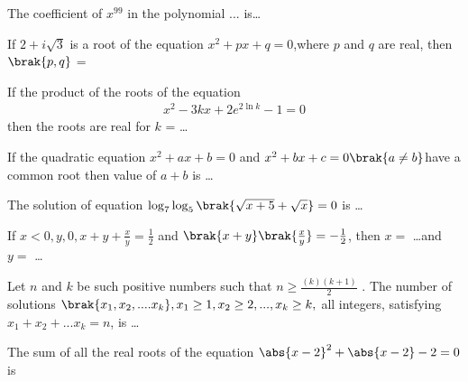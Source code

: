 \iffalse
\title{CHAPTER - 3\\Quadratic equation}
\author{AI24BTECH11028 - Ronit Ranjan}
\section{fitb}
\fi

    \item The coefficient of $x^{99}$ in the polynomial ...
    is\dots \hfill {}
    
    \item If $2+i\sqrt{3}$ is a root of the equation $x^2 + px +q =0$,where $p$ and $q$ are real, then $\brak{p,q}$ = \brak{\dots , \dots}\hfill {}
    
    \item If the product of the roots of the equation\\
    \begin{align*}
        x^2 -3kx +2e^{2\ln{k}} -1=0
    \end{align*}
    then the roots are real for $k$ = \dots\hfill {}
    
    \item If the quadratic equation $x^2 + ax +b=0$ and $x^2 + bx + c=0 \brak{a \ne b}$have a common root then value of $a+b$ is \dots \hfill {}
    
    \item The solution of equation $\log_{7}\log_{5}\brak{\sqrt{x+5}+\sqrt{x}}=0$ is \dots \hfill {}
    
    \item If $x<0, y,0, x + y + \frac{x}{y} = \frac{1}{2}$ and $\brak{x+y}\brak{\frac{x
    }{y}} = -\frac{1}{2}$, then $x=$ \dots and $y=$ \dots \hfill {}
    
    \item Let $n$ and $k$ be such positive numbers such that $n \geq \frac{(k)(k+1)}{2}$ . The number of solutions $\brak{x_1,x_2,....x_k}, x_1 \geq 1, x_2 \geq 2,...,x_k \geq k, $ all integers, satisfying $x_1+x_2+...x_k = n$, is \dots  \hfill {}
    \item The sum of all the real roots of the equation $\abs{x-2}^2+\abs{x-2}-2 = 0$ is \hfill {}






